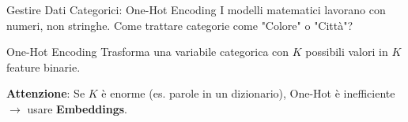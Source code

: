 \documentclass[aspectratio=169, 10pt]{beamer}
\begin{document}
\begin{frame}{Gestire Dati Categorici: One-Hot Encoding}
    I modelli matematici lavorano con numeri, non stringhe. Come trattare categorie come "Colore" o "Città"?
    
    \begin{block}{One-Hot Encoding}
        Trasforma una variabile categorica con $K$ possibili valori in $K$ feature binarie.
    \end{block}
    
    \vspace{1em}
    \centering
    
    \vspace{0.5em}
    \small \textbf{Attenzione}: Se $K$ è enorme (es. parole in un dizionario), One-Hot è inefficiente $\to$ usare \textbf{Embeddings}.
\end{frame}
\end{document}
